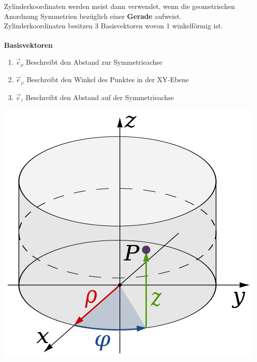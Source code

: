  {}
\beginip
Zylinderkoordinaten werden meist dann
verwendet, wenn die geometrischen Anordnung Symmetrien bezüglich einer \textbf{Gerade} aufweist. \\
Zylinderkoordinaten besitzen 3 Basisvektoren wovon 1 winkelförmig ist. \\
\\
\textbf{Basisvektoren}
\begin{enumerate}
	\item $\vec{e}_\rho$ Beschreibt den Abstand zur Symmetrieachse
	\item $\vec{e}_\varphi$ Beschreibt den Winkel des Punktes in der XY-Ebene
	\item $\vec{e}_z$ Beschreibt den Abstand auf der Symmetrieachse
\end{enumerate}
\begin{center}
\includegraphics[scale = 0.4]{zylinderkoord.png}
\end{center}


\iend
\newpage
{}


\beginip


